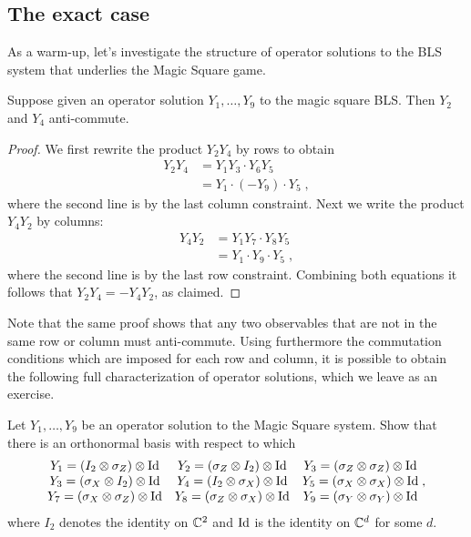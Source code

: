 \subsection{The exact case}

 As a warm-up, let's investigate the structure of operator solutions to the BLS system that underlies the Magic Square game. 

\begin{lemma}\label{lem:ms-ac}
Suppose given an operator solution $Y_1,\ldots,Y_9$ to the magic square BLS. Then $Y_2$ and $Y_4$ anti-commute. 
\end{lemma}

\begin{proof}
We first rewrite the product $Y_2Y_4$ by rows to obtain 
\begin{align*}
Y_2 Y_4 &= Y_1 Y_3\cdot   Y_6 Y_5 \\
&= Y_1 \cdot (-Y_9) \cdot Y_5\;,
\end{align*}
where the second line is by the last column constraint. Next we write the product $Y_4 Y_2$ by columns: 
\begin{align*}
Y_4 Y_2 &=  Y_1 Y_7 \cdot Y_8 Y_5  \\
&= Y_1 \cdot Y_9 \cdot Y_5 \;,
\end{align*}
where the second line is by the last row constraint. Combining both equations it follows that $Y_2 Y_4 = -Y_4 Y_2$, as claimed. 
\end{proof}

Note that the same proof shows that any two observables that are not in the same row or column must anti-commute. Using furthermore the commutation conditions which are imposed for each row and column, it is possible to obtain the following full characterization of operator solutions, which we leave as an exercise. 

\begin{exercise}\label{ex:ms-opsol}
Let $Y_1,\ldots,Y_9$ be an operator solution to the Magic Square system. Show that there is an orthonormal basis with respect to which 
\[ \begin{matrix} Y_1 = (I_2 \otimes \sigma_Z)\otimes \mathop{\rm Id}\nolimits & Y_2 = (\sigma_Z\otimes I_2)\otimes \mathop{\rm Id}\nolimits & Y_3=(\sigma_Z\otimes \sigma_Z)\otimes \mathop{\rm Id}\nolimits \\
Y_3 = (\sigma_X\otimes I_2)\otimes \mathop{\rm Id}\nolimits & Y_4 = (I_2\otimes \sigma_X)\otimes \mathop{\rm Id}\nolimits & Y_5 = (\sigma_X\otimes \sigma_X)\otimes \mathop{\rm Id}\nolimits \\ Y_7 = (\sigma_X\otimes \sigma_Z)\otimes \mathop{\rm Id}\nolimits & Y_8=(\sigma_Z\otimes \sigma_X)\otimes \mathop{\rm Id}\nolimits & Y_9 = (\sigma_Y\otimes \sigma_Y)\otimes \mathop{\rm Id}\nolimits \end{matrix}\;,\]
where $I_2$ denotes the identity on $\mathbb{C}^2$ and $\mathop{\rm Id}\nolimits$ is the identity on $\mathbb{C}^d$ for some $d$.
\end{exercise}


